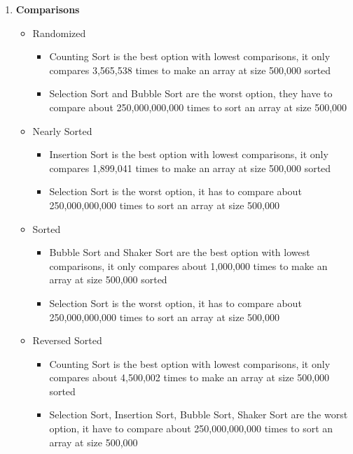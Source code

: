 \documentclass[11pt,a4paper]{article}
\begin{document}
{{\begin{enumerate}
\begin{itemize}
	            \end{itemize}
	        \item \textbf{Comparisons}
	            \begin{itemize}
	                \item Randomized 
	                \begin{itemize}
	                    \item Counting Sort is the best option with lowest comparisons, it only compares 3,565,538 times to make an array at size 500,000 sorted
	                    \item Selection Sort and Bubble Sort are the worst option, they have to compare about 250,000,000,000 times to sort an array at size 500,000
	                \end{itemize}
	                \item Nearly Sorted
	                \begin{itemize}
	                    \item Insertion Sort is the best option with lowest comparisons, it only compares 1,899,041 times to make an array at size 500,000 sorted
	                    \item Selection Sort is the worst option, it has to compare about 250,000,000,000 times to sort an array at size 500,000
	                \end{itemize}
	                \item Sorted
	                \begin{itemize}
	                    \item Bubble Sort and Shaker Sort are the best option with lowest comparisons, it only compares about 1,000,000 times to make an array at size 500,000 sorted
	                    \item Selection Sort is the worst option, it has to compare about 250,000,000,000 times to sort an array at size 500,000
	                \end{itemize}
	                \item Reversed Sorted
	                \begin{itemize}
	                    \item Counting Sort is the best option with lowest comparisons, it only compares about 4,500,002 times to make an array at size 500,000 sorted
	                    \item Selection Sort, Insertion Sort, Bubble Sort, Shaker Sort are the worst option, it have to compare about 250,000,000,000 times to sort an array at size 500,000
	                \end{itemize}
	            \end{itemize}
	    \end{enumerate}
	
}}
\end{document}
